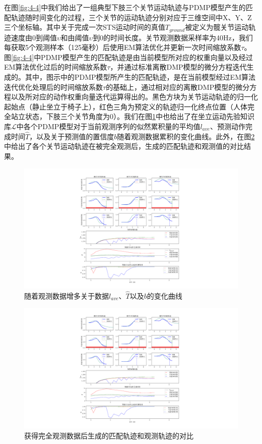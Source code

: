 在图\ref{fig:4-4}中我们给出了一组典型下肢三个关节运动轨迹与PDMP模型产生的匹配轨迹随时间变化的过程，三个关节的运动轨迹分别对应于三维空间中X、Y、Z三个坐标轴。其中关于完成一次STS运动时间的真值$T_{ground}$被定义为髋关节运动轨迹速度由0到阈值$\upsilon $和由阈值$\upsilon$到0的时间长度。关节观测数据采样率为40Hz，我们每获取5个观测样本（125毫秒）后使用EM算法优化并更新一次时间缩放系数$\tau$。图\ref{fig:4-4}中PDMP模型产生的匹配轨迹是由当前模型所对应的权重向量以及经过EM算法优化过后的时间缩放系数$\tau$，并通过标准离散DMP模型的微分方程迭代生成的。其中，图示中的PDMP模型所产生的匹配轨迹，是在当前模型经过EM算法迭代优化处理后的时间缩放系数$\tau$的基础上，通过相对应的离散DMP模型的微分方程以及所对应的动作权重向量迭代运算得出的。黑色方块为关节运动轨迹的归一化起始点（静止坐立于椅子上），红色三角为预定义的轨迹归一化终点位置（人体完全站立状态，下肢三个关节角度为0）。我们在图\ref{fig:4-5}中也给出了在坐立运动先验知识库$\mathscr{L}$中各个PDMP模型对于当前观测序列的似然累积量的平均值$l_{ave}$、预测动作完成时间$\hat T$，以及关于预测值的置信度$b$随着观测数据累积的变化曲线。此外，在图\ref{fig:4-6}中给出了各个关节运动轨迹在被完全观测后，生成的匹配轨迹和观测值的对比结果。
\begin{figure}[htb]
    \centering\includegraphics[width=1\textwidth]{figures/4-Fig-5.pdf}
    \caption{随着观测数据增多关于数据$l_{ave}$、$\hat T$以及$b$的变化曲线}
    \label{fig:4-5}
\end{figure}

\begin{figure}[htb]
    \centering\includegraphics[width=1\textwidth]{figures/4-Fig-6.pdf}
    \caption{获得完全观测数据后生成的匹配轨迹和观测轨迹的对比}
    \label{fig:4-6}
\end{figure}

